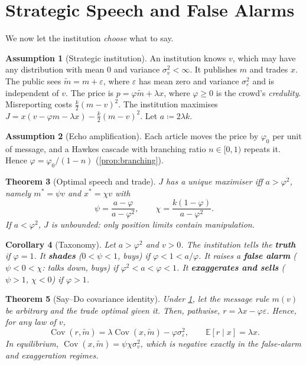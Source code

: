 \documentclass{article}
\theoremstyle{plain}
\newtheorem{theorem}{Theorem}[section]
\newtheorem{corollary}[theorem]{Corollary}
\theoremstyle{definition}
\newtheorem{assumption}[theorem]{Assumption}
\theoremstyle{remark}
\newcommand{\E}{\mathbb{E}}
\DeclareMathOperator{\Cov}{Cov}
\begin{document}
\section{Strategic Speech and False Alarms}\label{sec:strategic}

We now let the institution \emph{choose} what to say.

\begin{assumption}[Strategic institution]\label{ass:strategic}
An institution knows $v$, which may have any distribution with mean $0$ and variance $\sigma_v^2<\infty$. It publishes $m$ and trades $x$. The public sees $\tilde m=m+\varepsilon$, where $\varepsilon$ has mean zero and variance $\sigma_\varepsilon^2$ and is independent of $v$. The price is $p=\varphi\tilde m+\lambda x$, where $\varphi\ge0$ is the crowd's \emph{credulity}. Misreporting costs $\tfrac k2(m-v)^2$. The institution maximises $J=x(v-\varphi m-\lambda x)-\tfrac k2(m-v)^2$. Let $a\coloneqq2\lambda k$.
\end{assumption}

\begin{assumption}[Echo amplification]\label{ass:amplify}
Each article moves the price by $\varphi_0$ per unit of message, and a Hawkes cascade with branching ratio $n\in[0,1)$ repeats it. Hence $\varphi=\varphi_0/(1-n)$ (\cref{prop:branching}).
\end{assumption}

\begin{theorem}[Optimal speech and trade]\label{thm:speech}
$J$ has a unique maximiser iff $a>\varphi^2$, namely $m^\ast=\psi v$ and $x^\ast=\chi v$ with
\[
  \psi=\frac{a-\varphi}{a-\varphi^2},\qquad \chi=\frac{k(1-\varphi)}{a-\varphi^2}.
\]
If $a<\varphi^2$, $J$ is unbounded: only position limits contain manipulation.
\end{theorem}

\begin{corollary}[Taxonomy]\label{cor:taxonomy}
Let $a>\varphi^2$ and $v>0$. The institution tells the \textbf{truth} if $\varphi=1$. It \textbf{shades} ($0<\psi<1$, buys) if $\varphi<1<a/\varphi$. It raises a \textbf{false alarm} ($\psi<0<\chi$: talks down, buys) if $\varphi^2<a<\varphi<1$. It \textbf{exaggerates and sells} ($\psi>1$, $\chi<0$) if $\varphi>1$.
\end{corollary}

\begin{theorem}[Say--Do covariance identity]\label{thm:identity}
Under \cref{ass:strategic}, let the message rule $m(v)$ be \emph{arbitrary} and the trade optimal given it. Then, pathwise, $r=\lambda x-\varphi\varepsilon$. Hence, for any law of $v$,
\[
  \Cov(r,\tilde m)=\lambda\Cov(x,\tilde m)-\varphi\sigma_\varepsilon^2,\qquad \E[r\mid x]=\lambda x.
\]
In equilibrium, $\Cov(x,\tilde m)=\psi\chi\sigma_v^2$, which is negative exactly in the false-alarm and exaggeration regimes.
\end{theorem}
\end{document}
